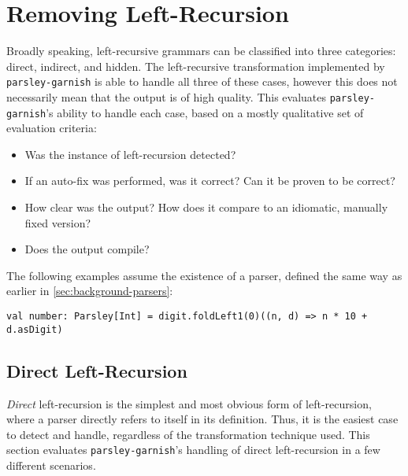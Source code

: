 \documentclass[../../main.tex]{subfiles}
\begin{document}
\section{Removing Left-Recursion}\label{sec:eval-leftrec}
Broadly speaking, left-recursive grammars can be classified into three categories: direct, indirect, and hidden.
The left-recursive transformation implemented by \texttt{parsley-garnish} is able to handle all three of these cases, however this does not necessarily mean that the output is of high quality.
This  evaluates \texttt{parsley-garnish}'s ability to handle each case, based on a mostly qualitative set of evaluation criteria:
\begin{itemize}
  \item Was the instance of left-recursion detected?
  \item If an auto-fix was performed, was it correct? Can it be proven to be correct?
  \item How clear was the output? How does it compare to an idiomatic, manually fixed version?
  \item Does the output compile?
\end{itemize}
%
The following examples assume the existence of a  parser, defined the same way as earlier in \cref{sec:background-parsers}:
\begin{verbatim}
val number: Parsley[Int] = digit.foldLeft1(0)((n, d) => n * 10 + d.asDigit)
\end{verbatim}

\subsection{Direct Left-Recursion}
\emph{Direct} left-recursion is the simplest and most obvious form of left-recursion, where a parser directly refers to itself in its definition.
Thus, it is the easiest case to detect and handle, regardless of the transformation technique used.
This section evaluates \texttt{parsley-garnish}'s handling of direct left-recursion in a few different scenarios.
\end{document}

